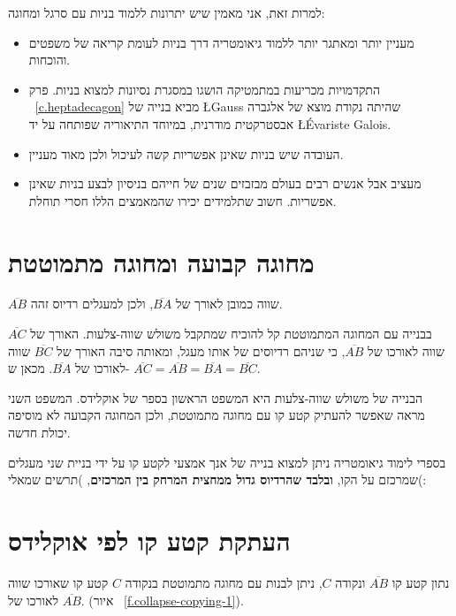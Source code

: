 למרות זאת, אני מאמין שיש יתרונות ללמוד בניות עם סרגל ומחוגה:
\begin{itemize}
\item
מעניין יותר ומאתגר יותר ללמוד גיאומטריה דרך בניות לעומת קריאה של משפטים והוכחות.
\item
התקדמויות מכריעות במתמטיקה הושגו במסגרת נסיונות למצוא בניות. פרק%
~\ref{c.heptadecagon}
מביא בנייה של 
\L{Gauss}
שהיתה נקודת מוצא של אלגברה אבסטרקטית מודרנית, במיוחד התיאוריה שפותחה על יד 
\L{\'{E}variste Galois}.
\item
העובדה שיש בניות שאינן אפשריות קשה לעיכול ולכן מאוד מעניין.
\item
מעציב אבל אנשים רבים בעולם מבזבזים שנים של חייהם בניסיון לבצע בניות שאינן אפשריות. חשוב שתלמידים יכירו שהמאמצים הללו חסרי תוחלת.
\end{itemize}



\section{מחוגה קבועה ומחוגה מתמוטטת}\label{s.collapse}

$\overline{AB}$
שווה כמובן לאורך של
$\overline{BA}$,
ולכן למעגלים רדיוס זהה.

בבנייה עם המחוגה המתמוטטת קל להוכיח שמתקבל משולש שווה-צלעות. האורך של
$\overline{AC}$
שווה לאורכו של
$\overline{AB}$,
כי שניהם רדיוסים של אותו מעגל, ומאותה סיבה האורך של
$\overline{BC}$
שווה לאורכו של
$\overline{BA}$.
מכאן ש-%
$\overline{AC} = \overline{AB} = \overline{BA} = \overline{BC}$.

הבנייה של משולש שווה-צלעות היא המשפט הראשון בספר של אוקלידס. המשפט השני מראה שאפשר להעתיק קטע קו עם מחוגה מתמוטטת, ולכן המחוגה הקבועה לא מוסיפה יכולת חדשה. 

בספרי לימוד גיאומטריה ניתן למצוא בנייה של אנך אמצעי לקטע קו על ידי בניית שני מעגלים שמרכזם על הקו, 
\textbf{ובלבד שהרדיוס גדול ממחצית המרחק בין המרכזים},
)תרשים שמאלי(:



\section{העתקת קטע קו לפי אוקלידס}\label{s.collapse-copy}

\begin{theorem}
נתון קטע קו
$\overline{AB}$
ונקודה
$C$,
ניתן לבנות עם מחוגה מתמוטטת בנקודה
$C$
קטע קו שאורכו שווה לאורכו של 
$\overline{AB}$.
(איור%
~\ref{f.collapse-copying-1}).
\end{theorem}


